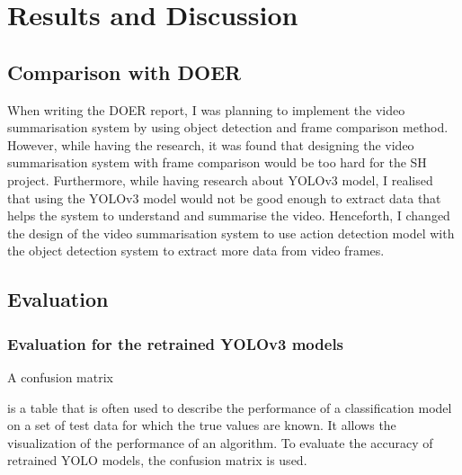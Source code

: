 \documentclass{article}
\begin{document}
\section{Results and Discussion}

\subsection{Comparison with DOER}

When writing the DOER report, I was planning to implement the video summarisation system by using object detection and frame comparison method. However, while having the research, it was found that designing the video summarisation system with frame comparison would be too hard for the SH project. Furthermore, while having research about YOLOv3 model, I realised that using the YOLOv3 model would not be good enough to extract data that helps the system to understand and summarise the video. Henceforth, I changed the design of the video summarisation system to use action detection model with the object detection system to extract more data from video frames.

\subsection{Evaluation}

\subsubsection{Evaluation for the retrained YOLOv3 models}

\hypertarget{evaluate_yolo_with_cm}{A confusion matrix} is a table that is often used to describe the performance of a classification model on a set of test data for which the true values are known. It allows the visualization of the performance of an algorithm. To evaluate the accuracy of retrained YOLO models, the confusion matrix is used.
\end{document}
